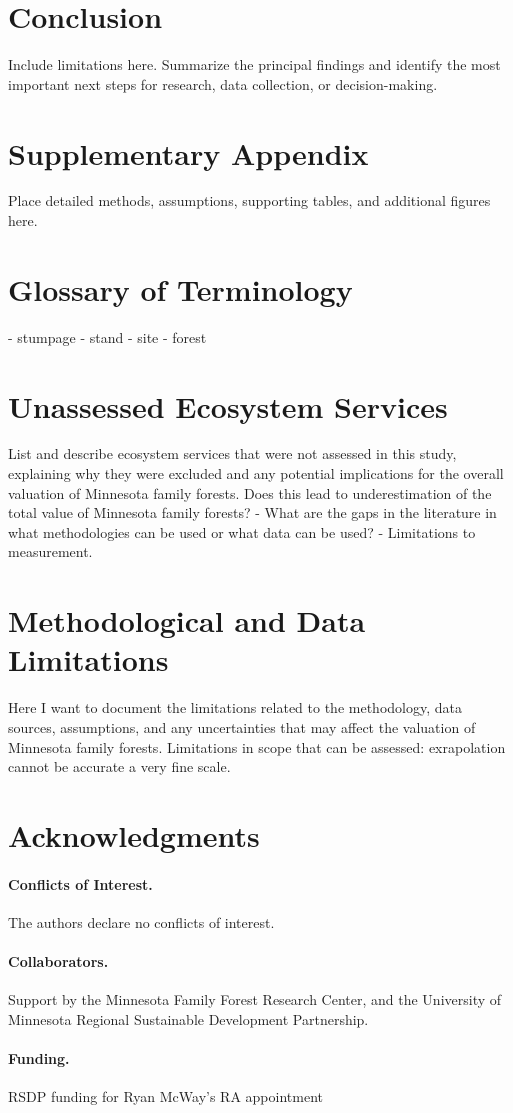 \documentclass[11pt]{article}
\begin{document}
\section{Conclusion}
Include limitations here. 
Summarize the principal findings and identify the most important next steps for research, data collection, or decision-making.





\appendix
\section{Supplementary Appendix}
Place detailed methods, assumptions, supporting tables, and additional figures here.

\section{Glossary of Terminology}

- stumpage
- stand
- site
- forest

\section{Unassessed Ecosystem Services}
List and describe ecosystem services that were not assessed in this study, explaining why they were excluded and any potential implications for the overall valuation of Minnesota family forests.
Does this lead to underestimation of the total value of Minnesota family forests?
- What are the gaps in the literature in what methodologies can be used or what data can be used? 
	- Limitations to measurement. 

\section{Methodological and Data Limitations}
Here I want to document the limitations related to the methodology, data sources, assumptions, and any uncertainties that may affect the valuation of Minnesota family forests.
Limitations in scope that can be assessed: exrapolation cannot be accurate a very fine scale. 


\section{Acknowledgments}

\paragraph{Conflicts of Interest.}
The authors declare no conflicts of interest.

\paragraph{Collaborators.}
Support by the Minnesota Family Forest Research Center, and the University of Minnesota Regional Sustainable Development Partnership. 

\paragraph{Funding.}
RSDP funding for Ryan McWay's RA appointment
\end{document}
